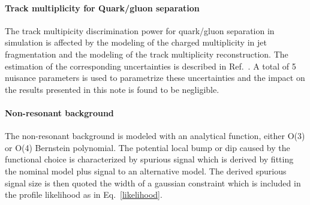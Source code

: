 \paragraph{Track multiplicity for Quark/gluon separation}

The track multipicity discrimination power for quark/gluon separation in simulation 
is affected by the modeling of the charged multiplicity in jet fragmentation and the modeling of the
track multiplicity reconstruction. The estimation of the corresponding uncertainties is 
described in Ref.~\cite{qgtagging}. A total of 5 nuisance parameters is used to parametrize these
uncertainties and the impact on the results presented in this note is found to be negligible.

\paragraph{Non-resonant background}
The non-resonant background is modeled with an analytical function, either O(3) or O(4) Bernstein polynomial. 
The potential local bump or dip caused by the functional choice is characterized by spurious signal 
which is derived by fitting the nominal model plus signal to an alternative model. The derived spurious signal 
size is then quoted the width of a gaussian constraint which is included in the profile likelihood as in 
Eq.~\ref{likelihood}.

%
%

% 


